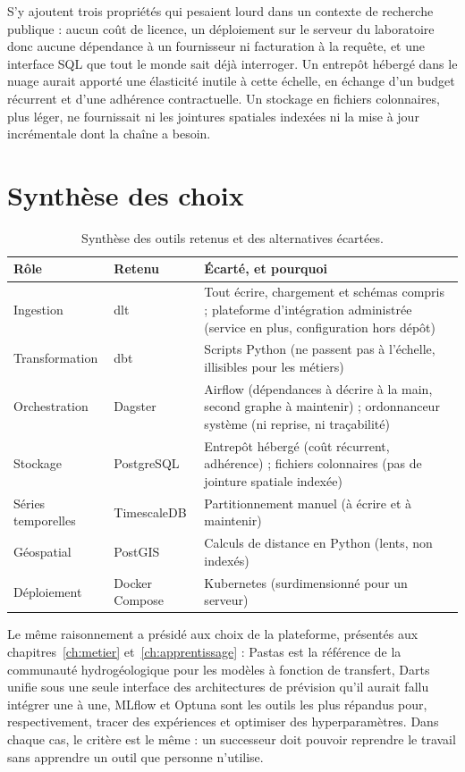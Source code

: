 S'y ajoutent trois propriétés qui pesaient lourd dans un contexte de recherche publique : aucun
coût de licence, un déploiement sur le serveur du laboratoire donc aucune dépendance à un
fournisseur ni facturation à la requête, et une interface SQL que tout le monde sait déjà
interroger. Un entrepôt hébergé dans le nuage aurait apporté une élasticité inutile à cette
échelle, en échange d'un budget récurrent et d'une adhérence contractuelle. Un stockage en
fichiers colonnaires, plus léger, ne fournissait ni les jointures spatiales indexées ni la mise
à jour incrémentale dont la chaîne a besoin.

\section{Synthèse des choix}

\begin{table}[H]
\centering
\caption{Synthèse des outils retenus et des alternatives écartées.}
\label{tab:synthese-outils}
\begin{tabularx}{\textwidth}{@{}llX@{}}
\toprule
\textbf{Rôle} & \textbf{Retenu} & \textbf{Écarté, et pourquoi} \\
\midrule
Ingestion & dlt & Tout écrire, chargement et schémas compris ; plateforme d'intégration
administrée (service en plus, configuration hors dépôt) \\
Transformation & dbt & Scripts Python (ne passent pas à l'échelle, illisibles pour les métiers) \\
Orchestration & Dagster & Airflow (dépendances à décrire à la main, second graphe à maintenir) ;
ordonnanceur système (ni reprise, ni traçabilité) \\
Stockage & PostgreSQL & Entrepôt hébergé (coût récurrent, adhérence) ; fichiers colonnaires
(pas de jointure spatiale indexée) \\
Séries temporelles & TimescaleDB & Partitionnement manuel (à écrire et à maintenir) \\
Géospatial & PostGIS & Calculs de distance en Python (lents, non indexés) \\
Déploiement & Docker Compose & Kubernetes (surdimensionné pour un serveur) \\
\bottomrule
\end{tabularx}
\end{table}

Le même raisonnement a présidé aux choix de la plateforme, présentés aux
chapitres~\ref{ch:metier} et~\ref{ch:apprentissage} : Pastas est la référence de la communauté
hydrogéologique pour les modèles à fonction de transfert, Darts unifie sous une seule interface
des architectures de prévision qu'il aurait fallu intégrer une à une, MLflow et Optuna sont les
outils les plus répandus pour, respectivement, tracer des expériences et optimiser des
hyperparamètres. Dans chaque cas, le critère est le même : un successeur doit pouvoir reprendre
le travail sans apprendre un outil que personne n'utilise.

